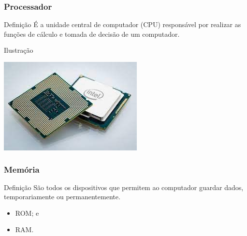 \documentclass[aspectratio=169]{beamer} %
\begin{document}
\begin{frame}
	\frametitle{Processador}
	
	\begin{block}{Defini\c cão}
		É a unidade central de computador (CPU) responsável por realizar as funções de cálculo e tomada de decisão de um computador.
	\end{block}\vfill
	
	\begin{exampleblock}{Ilustra\c cão}
		\begin{center}
			\includegraphics[scale=0.4]{img/processador}
		\end{center}
	\end{exampleblock}
\end{frame}

\begin{frame}
	\frametitle{Memória}
	
	\begin{block}{Defini\c cão}
		São todos os dispositivos que permitem ao computador guardar dados, temporariamente ou permanentemente.
	\end{block}\vfill
	
	\begin{itemize}
		\item ROM; e
		\item RAM.
	\end{itemize}
\end{frame}
\end{document}
